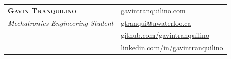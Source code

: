 \begin{center}
    \begin{tabularx}{\textwidth}{@{}X X@{}}
        \textbf{\Huge \scshape \href{https://www.gavintranquilino.com}{Gavin Tranquilino}} &
        \textbf{\hfill} \href{https://www.gavintranquilino.com}{\underline{gavintranquilino.com}}                                                                                                             \\
        \textit{\Large Mechatronics Engineering Student}                                   
        & \textbf{\hfill} \href{mailto:gtranqui@uwaterloo.ca}{\underline{gtranqui@uwaterloo.ca}}                     \\
        & \textbf{\hfill} \href{https://github.com/gavintranquilino}{\underline{github.com/gavintranquilino}} \\
        & \textbf{\hfill} \href{https://linkedin.com/in/gavintranquilino}{\underline{linkedin.com/in/gavintranquilino}} \end{tabularx} \end{center}

